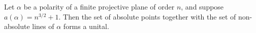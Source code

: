 Let $\alpha$ be a polarity of a finite projective plane of order $n$, and suppose $a(\alpha) = n^{3/2}+1$. Then the set of absolute points together with the set of non-absolute lines of $\alpha$ forms a unital.

